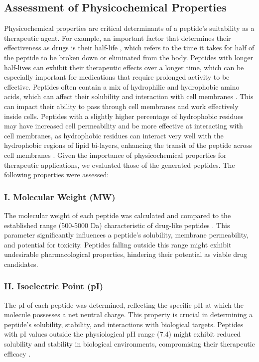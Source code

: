 \subsection{Assessment of Physicochemical Properties}
Physicochemical properties are critical determinants of a peptide's suitability as a therapeutic agent. For example, an important factor that determines their effectiveness as drugs is their half-life \cite{nugrahadi2023designing}, which refers to the time it takes for half of the peptide to be broken down or eliminated from the body. Peptides with longer half-lives can exhibit their therapeutic effects over a longer time, which can be especially important for medications that require prolonged activity to be effective. Peptides often contain a mix of hydrophilic and hydrophobic amino acids, which can affect their solubility and interaction with cell membranes \cite{madani2011mechanisms}. This can impact their ability to pass through cell membranes and work effectively inside cells. Peptides with a slightly higher percentage of hydrophobic residues may have increased cell permeability \cite{madani2011mechanisms} and be more effective at interacting with cell membranes, as hydrophobic residues can interact very well with the hydrophobic regions of lipid bi-layers, enhancing the transit of the peptide across cell membranes \cite{madani2011mechanisms}. Given the importance of physicochemical properties for therapeutic applications, we evaluated those of the generated peptides. The following properties were assessed:

\subsubsection*{I. Molecular Weight (MW)}
The molecular weight of each peptide was calculated and compared to the established range (500-5000 Da) characteristic of drug-like peptides \cite{erckes2022story}. This parameter significantly influences a peptide's solubility, membrane permeability, and potential for toxicity. Peptides falling outside this range might exhibit undesirable pharmacological properties, hindering their potential as viable drug candidates.

\subsubsection*{II. Isoelectric Point (pI)}
The pI of each peptide was determined, reflecting the specific pH at which the molecule possesses a net neutral charge. This property is crucial in determining a peptide's solubility, stability, and interactions with biological targets. Peptides with pI values outside the physiological pH range (7.4) might exhibit reduced solubility and stability in biological environments, compromising their therapeutic efficacy \cite{frolov2022pichemist}.

